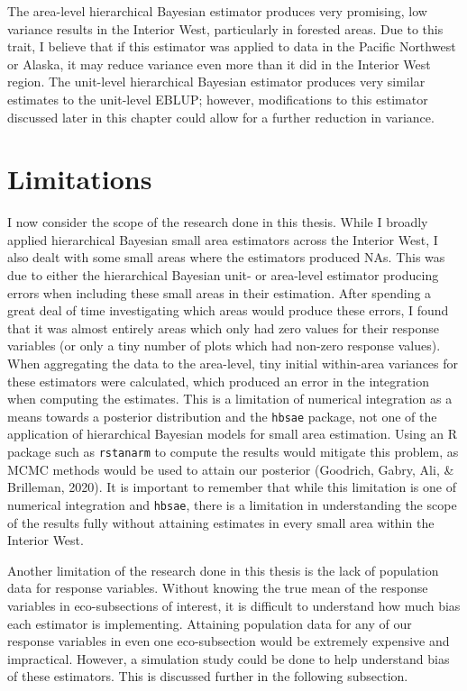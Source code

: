 \documentclass[12pt,twoside]{reedthesis}
\begin{document}
The area-level hierarchical Bayesian estimator produces very promising, low variance results in the Interior West, particularly in forested areas. Due to this trait, I believe that if this estimator was applied to data in the Pacific Northwest or Alaska, it may reduce variance even more than it did in the Interior West region. The unit-level hierarchical Bayesian estimator produces very similar estimates to the unit-level EBLUP; however, modifications to this estimator discussed later in this chapter could allow for a further reduction in variance.

\hypertarget{limitations}{%
\section{Limitations}\label{limitations}}

I now consider the scope of the research done in this thesis. While I broadly applied hierarchical Bayesian small area estimators across the Interior West, I also dealt with some small areas where the estimators produced NAs. This was due to either the hierarchical Bayesian unit- or area-level estimator producing errors when including these small areas in their estimation. After spending a great deal of time investigating which areas would produce these errors, I found that it was almost entirely areas which only had zero values for their response variables (or only a tiny number of plots which had non-zero response values). When aggregating the data to the area-level, tiny initial within-area variances for these estimators were calculated, which produced an error in the integration when computing the estimates. This is a limitation of numerical integration as a means towards a posterior distribution and the \texttt{hbsae} package, not one of the application of hierarchical Bayesian models for small area estimation. Using an R package such as \texttt{rstanarm} to compute the results would mitigate this problem, as MCMC methods would be used to attain our posterior (Goodrich, Gabry, Ali, \& Brilleman, 2020). It is important to remember that while this limitation is one of numerical integration and \texttt{hbsae}, there is a limitation in understanding the scope of the results fully without attaining estimates in every small area within the Interior West.

Another limitation of the research done in this thesis is the lack of population data for response variables. Without knowing the true mean of the response variables in eco-subsections of interest, it is difficult to understand how much bias each estimator is implementing. Attaining population data for any of our response variables in even one eco-subsection would be extremely expensive and impractical. However, a simulation study could be done to help understand bias of these estimators. This is discussed further in the following subsection.
\end{document}
